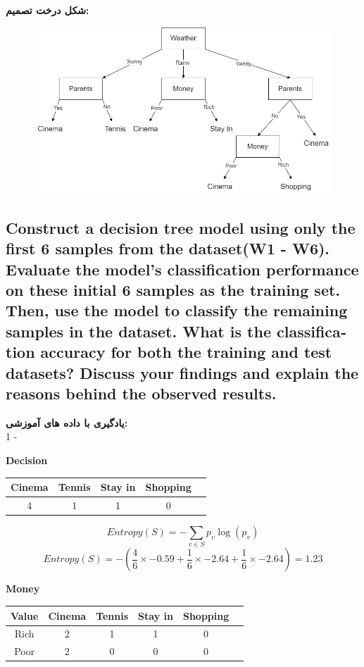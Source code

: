 \documentclass{article}
\begin{document}
	\textbf{شکل درخت تصمیم:}
	
		\begin{figure}[h!]
			\centering
			\includegraphics[scale=0.5]{figs/ID3_Q2_a}
		\end{figure}
	\textbf{}
	\newpage
	\begin{latin}
		\subsection{Construct a decision tree model using only the first 6 samples from the
			dataset(W1 - W6). Evaluate the model's classification performance on
			these initial 6 samples as the training set. Then, use the model to classify
			the remaining samples in the dataset. What is the classification accuracy
			for both the training and test datasets? Discuss your findings and explain			the reasons behind the observed results.}
	\end{latin}
	\noindent
	\textbf{یادگیری با داده های آموزشی:}\\
	1 - 
	\begin{latin}
		\textbf{Decision}
		\begin{center}
			\begin{tabular}{|c|c|c|c|c|}
				\hline
				Cinema & Tennis & Stay in & Shopping\\
				\hline
				\hline
				4 & 1 & 1 & 0\\
				\hline
			\end{tabular}
		\end{center}
	\end{latin}
	\vspace{5pt}
	\[
	Entropy(S) = -\sum_{v \in S} p_v\log (p_v)
	\]
	\[
	Entropy(S) = -( \frac{4}{6} \times -0.59 + \frac{1}{6} \times -2.64 + \frac{1}{6} \times -2.64) = 1.23
	\]
	\begin{latin}
		\textbf{Money}
		\begin{center}
			\begin{tabular}{|c|c|c|c|c|c|}
				\hline
				Value & Cinema & Tennis & Stay in & Shopping\\
				\hline
				\hline
				Rich & 2 & 1 & 1 & 0\\
				\hline
				Poor & 2 & 0 & 0 & 0\\
				\hline
			\end{tabular}
		\end{center}
	\end{latin}
\end{document}
